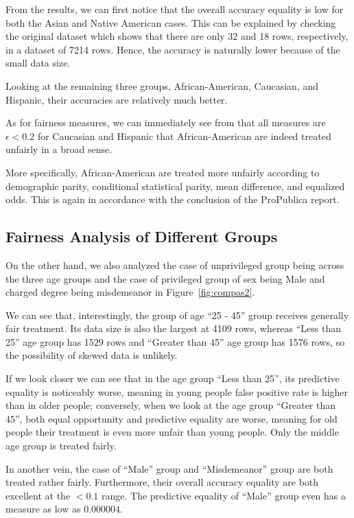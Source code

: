 \documentclass[conference]{IEEEtran}
\begin{document}
From the results, we can first notice that the overall accuracy equality is low for both the Asian and Native American cases. This can be explained by checking the original dataset which shows that there are only 32 and 18 rows, respectively, in a dataset of 7214 rows. Hence, the accuracy is naturally lower because of the small data size.

Looking at the remaining three groups, African-American, Caucasian, and Hispanic, their accuracies are relatively much better.

As for fairness measures, we can immediately see from that all measures are $\epsilon < 0.2$ for Caucasian and Hispanic that African-American are indeed treated unfairly in a broad sense.

More specifically, African-American are treated more unfairly according to demographic parity, conditional statistical parity, mean difference, and equalized odds. This is again in accordance with the conclusion of the ProPublica report.

\subsection{Fairness Analysis of Different Groups}
On the other hand, we also analyzed the case of unprivileged group being across the three age groups and the case of privileged group of sex being Male and charged degree being misdemeanor in Figure~\ref{fig:compas2}.

We can see that, interestingly, the group of age ``25 - 45'' group receives generally fair treatment. Its data size is also the largest at 4109 rows, whereas ``Less than 25'' age group has 1529 rows and ``Greater than 45'' age group has 1576 rows, so the possibility of skewed data is unlikely.

If we look closer we can see that in the age group ``Less than 25'', its predictive equality is noticeably worse, meaning in young people false positive rate is higher than in older people; conversely, when we look at the age group ``Greater than 45'', both equal opportunity and predictive equality are worse, meaning for old people their treatment is even more unfair than young people. Only the middle age group is treated fairly.

In another vein, the case of ``Male'' group and ``Misdemeanor'' group are both treated rather fairly. Furthermore, their overall accuracy equality are both excellent at the $< 0.1$ range. The predictive equality  of ``Male'' group even has a measure as low as $0.000004$.
\end{document}
